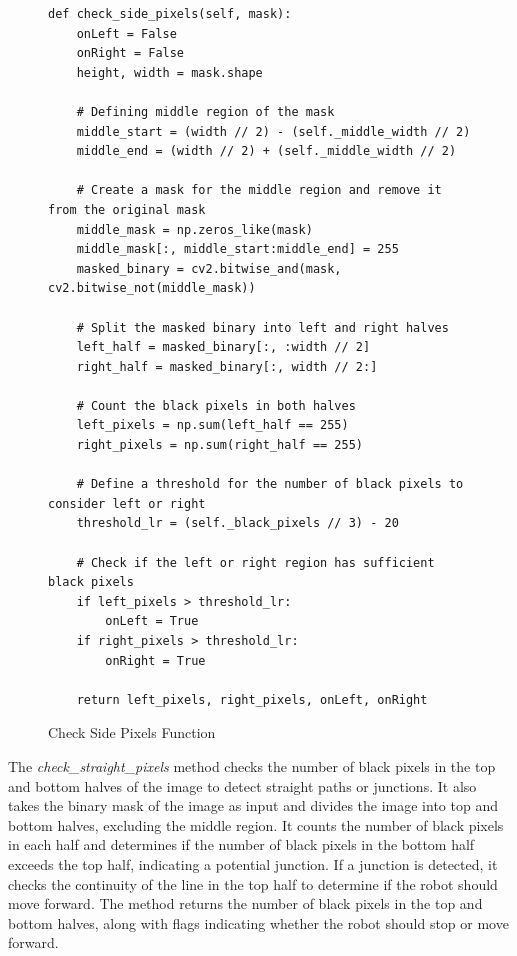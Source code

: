 \documentclass[a4paper,12pt]{extreport}
\begin{document}
\begin{figure}
\begin{verbatim}
def check_side_pixels(self, mask):
    onLeft = False
    onRight = False
    height, width = mask.shape

    # Defining middle region of the mask
    middle_start = (width // 2) - (self._middle_width // 2)
    middle_end = (width // 2) + (self._middle_width // 2)
    
    # Create a mask for the middle region and remove it from the original mask
    middle_mask = np.zeros_like(mask)
    middle_mask[:, middle_start:middle_end] = 255 
    masked_binary = cv2.bitwise_and(mask, cv2.bitwise_not(middle_mask))

    # Split the masked binary into left and right halves
    left_half = masked_binary[:, :width // 2]
    right_half = masked_binary[:, width // 2:]

    # Count the black pixels in both halves
    left_pixels = np.sum(left_half == 255)
    right_pixels = np.sum(right_half == 255)
    
    # Define a threshold for the number of black pixels to consider left or right
    threshold_lr = (self._black_pixels // 3) - 20
    
    # Check if the left or right region has sufficient black pixels
    if left_pixels > threshold_lr:
        onLeft = True
    if right_pixels > threshold_lr:
        onRight = True
    
    return left_pixels, right_pixels, onLeft, onRight

\end{verbatim}
\caption{Check Side Pixels Function}
\end{figure}

The \emph{check\_straight\_pixels} method checks the number of black
pixels in the top and bottom halves of the image to detect straight
paths or junctions. It also takes the binary mask of the image as input
and divides the image into top and bottom halves, excluding the middle
region. It counts the number of black pixels in each half and determines
if the number of black pixels in the bottom half exceeds the top half,
indicating a potential junction. If a junction is detected, it checks
the continuity of the line in the top half to determine if the robot
should move forward. The method returns the number of black pixels in
the top and bottom halves, along with flags indicating whether the robot
should stop or move forward.
\end{document}
